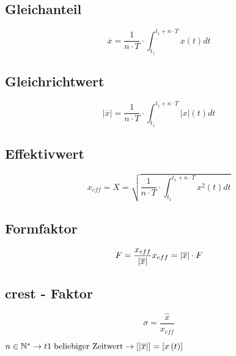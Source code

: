 \begin{multicols}{2}{}
\subsection{Gleichanteil}
\[ \overline{x} = \frac{1}{n \cdot T} \cdot \int_{t_{1}}^{t_{1} + n \cdot T} x \left( t \right) dt \]

\subsection{Gleichrichtwert}
\[ \left| \overline{x} \right| = \frac{1}{n \cdot T} \cdot 
\int_{t_{1}}^{t_{1} + n \cdot T} \left| x \right| \left( t \right) dt\]

\subsection{Effektivwert}
\[ x_{eff} = X = \sqrt{ \frac{1}{n \cdot T} \cdot \int_{t_{1}}^{t_{1} + n \cdot T} x^2 \left( t \right) dt} \]

\subsection{Formfaktor}
\[F = \frac{x_{eff}}{\left|\overline{x}\right|} \\ 
x_{eff} = \left|\overline{x}\right| \cdot F \]

\subsection{crest - Faktor}
\[ \sigma = \frac{\hat{x}}{x_{eff}} \]
\hfill
\end{multicols}

\(n \in \mathbb{N}^* \rightarrow
t1 \; \text{beliebiger Zeitwert} \rightarrow
\left[|\overline{x} \right|] = \left[ x\left( t \right) \right] \)


